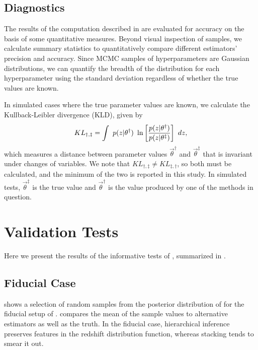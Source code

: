 \subsection{Diagnostics}

The results of the computation described in  are evaluated for accuracy on the basis of some quantitative measures.  
Beyond visual inspection of samples, we calculate summary statistics to quantitatively compare different estimators' precision and accuracy.  
Since MCMC samples of hyperparameters are Gaussian distributions, we can quantify the breadth of the distribution for each hyperparameter using the standard deviation regardless of whether the true values are known.  

In simulated cases where the true parameter values are known, we calculate the Kullback-Leibler divergence (KLD), given by 
\begin{equation}
\eqlabel{eq:kl}
KL_{\dagger,\ddagger} = \int\ p(z|\theta^{\dagger})\ \ln\left[\frac{p(z|\theta^{\dagger})}{p(z|\theta^{\ddagger})}\right]\ dz,
\end{equation}
which measures a distance between parameter values $\vec{\theta}^{\dagger}$ and $\vec{\theta}^{\ddagger}$ that is invariant under changes of variables.  
We note that $KL_{\dagger,\ddagger}\neq KL_{\ddagger,\dagger}$, so both must be calculated, and the minimum of the two is reported in this study.  
In simulated tests, $\vec{\theta}^{\ddagger}$ is the true value and $\vec{\theta}^{\dagger}$ is the value produced by one of the methods in question.  

\clearpage
\section{Validation Tests}

Here we present the results of the informative tests of , summarized in .  

\subsection{Fiducial Case}

 shows a selection of random samples from the posterior distribution of  for the fiducial setup of .  
 compares the mean of the sample values to alternative estimators as well as the truth.  
In the fiducial case, hierarchical inference preserves features in the redshift distribution function, whereas stacking tends to smear it out.  

